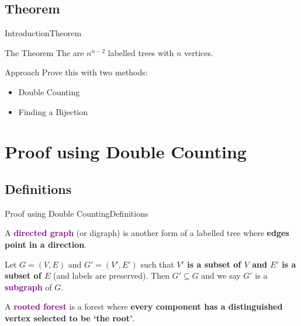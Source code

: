 \documentclass[10pt]{beamer}
\theoremstyle{definition}
\newcommand{\Sone}{Introduction}
\newcommand{\SoneSStheorem}{Theorem}
\newcommand{\Stwo}{Proof using Double Counting}
\newcommand{\StwoSSdefinitions}{Definitions}
\newcommand{\DefColor}{purple}
\begin{document}
\subsection{\SoneSStheorem}
\begin{frame}{\Sone}{\SoneSStheorem}
\begin{block}{The Theorem}
The are $n^{n-2}$ labelled trees with $n$ vertices. 
\end{block}
  
\pause{} 
 
\begin{block}{Approach}
Prove this with two methods:
\begin{itemize}
  \item Double Counting
  \pause{}
  \item Finding a Bijection
\end{itemize}
\end{block}
  
\end{frame}

\section{\Stwo}
\subsection{\StwoSSdefinitions}
\begin{frame}{\Stwo}{\StwoSSdefinitions}
\begin{definition}
A \textbf{\textcolor{\DefColor}{directed graph}} (or digraph) is another form of a labelled tree where \textbf{edges point in a direction}.
\end{definition}

\pause{}

\begin{definition}
Let $G=(V,E)$ and $G'=(V',E')$ such that \textbf{$V'$ is a subset of $V$ and $E'$ is a subset of $E$} (and labels are preserved). Then $G'\subseteq G$ and we say $G'$ is a \textbf{\textcolor{\DefColor}{subgraph}} of $G$.
\end{definition}

\pause{}

\begin{definition}
A \textbf{\textcolor{\DefColor}{rooted forest}} is a forest where \textbf{every component has a distinguished vertex selected to be `the root'}.
\end{definition}
  
\end{frame}
\end{document}
